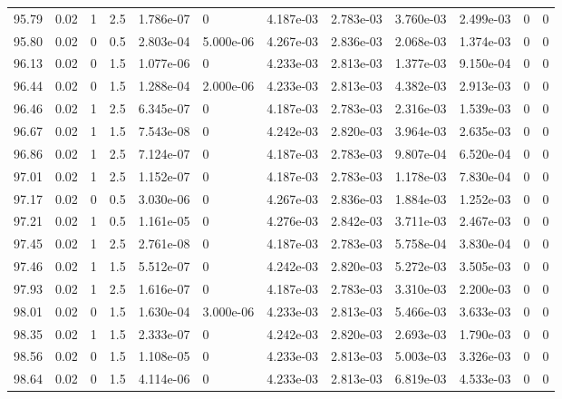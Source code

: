 \documentclass[preview]{standalone}
\begin{document}
{{{{{{{{{{{{{{\begin{tabular}{L{1.2cm}C{1.2cm} C{0.3cm}C{0.5cm} C{1.4cm}C{1.4cm} C{1.4cm}C{1.4cm} C{1.6cm}C{1.6cm} C{1.6cm}C{1.6cm}}
  95.79  &  0.02  & 1     & 2.5 &  1.786e-07  & 0  &  4.187e-03&   2.783e-03& 3.760e-03 & 2.499e-03   &  0 & 0  \\ 
  95.80  &  0.02  & 0     & 0.5 &  2.803e-04  & 5.000e-06  &  4.267e-03&   2.836e-03& 2.068e-03 & 1.374e-03   &  0 & 0  \\ 
  96.13  &  0.02  & 0     & 1.5 &  1.077e-06  & 0  &  4.233e-03&   2.813e-03& 1.377e-03 & 9.150e-04   &  0 & 0  \\ 
  96.44  &  0.02  & 0     & 1.5 &  1.288e-04  & 2.000e-06  &  4.233e-03&   2.813e-03& 4.382e-03 & 2.913e-03   &  0 & 0  \\ 
  96.46  &  0.02  & 1     & 2.5 &  6.345e-07  & 0  &  4.187e-03&   2.783e-03& 2.316e-03 & 1.539e-03   &  0 & 0  \\ 
  96.67  &  0.02  & 1     & 1.5 &  7.543e-08  & 0  &  4.242e-03&   2.820e-03& 3.964e-03 & 2.635e-03   &  0 & 0  \\ 
  96.86  &  0.02  & 1     & 2.5 &  7.124e-07  & 0  &  4.187e-03&   2.783e-03& 9.807e-04 & 6.520e-04   &  0 & 0  \\ 
  97.01  &  0.02  & 1     & 2.5 &  1.152e-07  & 0  &  4.187e-03&   2.783e-03& 1.178e-03 & 7.830e-04   &  0 & 0  \\ 
  97.17  &  0.02  & 0     & 0.5 &  3.030e-06  & 0  &  4.267e-03&   2.836e-03& 1.884e-03 & 1.252e-03   &  0 & 0  \\ 
  97.21  &  0.02  & 1     & 0.5 &  1.161e-05  & 0  &  4.276e-03&   2.842e-03& 3.711e-03 & 2.467e-03   &  0 & 0  \\ 
  97.45  &  0.02  & 1     & 2.5 &  2.761e-08  & 0  &  4.187e-03&   2.783e-03& 5.758e-04 & 3.830e-04   &  0 & 0  \\ 
  97.46  &  0.02  & 1     & 1.5 &  5.512e-07  & 0  &  4.242e-03&   2.820e-03& 5.272e-03 & 3.505e-03   &  0 & 0  \\ 
  97.93  &  0.02  & 1     & 2.5 &  1.616e-07  & 0  &  4.187e-03&   2.783e-03& 3.310e-03 & 2.200e-03   &  0 & 0  \\ 
  98.01  &  0.02  & 0     & 1.5 &  1.630e-04  & 3.000e-06  &  4.233e-03&   2.813e-03& 5.466e-03 & 3.633e-03   &  0 & 0  \\ 
  98.35  &  0.02  & 1     & 1.5 &  2.333e-07  & 0  &  4.242e-03&   2.820e-03& 2.693e-03 & 1.790e-03   &  0 & 0  \\ 
  98.56  &  0.02  & 0     & 1.5 &  1.108e-05  & 0  &  4.233e-03&   2.813e-03& 5.003e-03 & 3.326e-03   &  0 & 0  \\ 
  98.64  &  0.02  & 0     & 1.5 &  4.114e-06  & 0  &  4.233e-03&   2.813e-03& 6.819e-03 & 4.533e-03   &  0 & 0  \\ 

\end{tabular}}}}}}}}}}}}}}}
\end{document}
